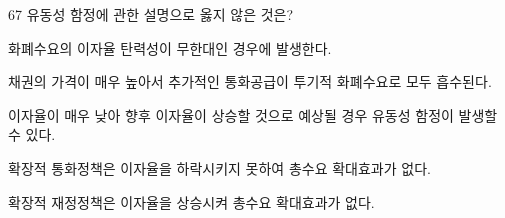 \begin{question}{67}
유동성 함정에 관한 설명으로 옳지 않은 것은?
\begin{choices}
  \item 화폐수요의 이자율 탄력성이 무한대인 경우에 발생한다.
  \item 채권의 가격이 매우 높아서 추가적인 통화공급이 투기적 화폐수요로 모두 흡수된다.
  \item 이자율이 매우 낮아 향후 이자율이 상승할 것으로 예상될 경우 유동성 함정이 발생할 수 있다.
  \item 확장적 통화정책은 이자율을 하락시키지 못하여 총수요 확대효과가 없다.
  \item 확장적 재정정책은 이자율을 상승시켜 총수요 확대효과가 없다.
\end{choices}
\end{question}
